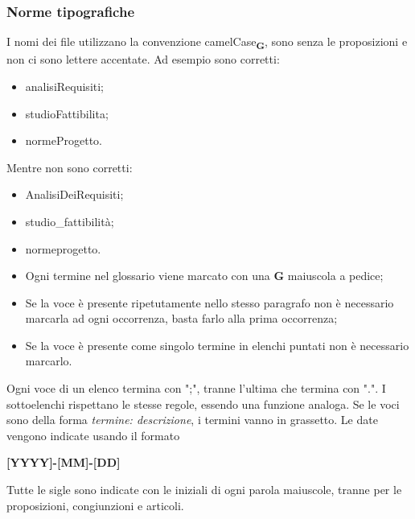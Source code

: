         \subsubsection{Norme tipografiche}
            I nomi dei file utilizzano la convenzione camelCase\textsubscript{\textbf{G}}, sono senza le proposizioni e non ci sono lettere accentate.
            Ad esempio sono corretti:
            \begin{itemize}
                \item analisiRequisiti;
                \item studioFattibilita;
                \item normeProgetto.
            \end{itemize}
            Mentre non sono corretti:
            \begin{itemize}
                \item AnalisiDeiRequisiti;
                \item studio\_fattibilità;
                \item normeprogetto.
            \end{itemize}
            
            \begin{itemize}
                \item Ogni termine nel glossario viene marcato con una \textbf{G} maiuscola a pedice;
                \item Se la voce è presente ripetutamente nello stesso paragrafo non è necessario marcarla ad ogni occorrenza, basta farlo alla prima occorrenza;
                \item Se la voce è presente come singolo termine in elenchi puntati non è necessario marcarlo. 
            \end{itemize}
            
            Ogni voce di un elenco termina con ";", tranne l'ultima che termina con ".". I sottoelenchi rispettano le stesse regole, essendo una funzione analoga. Se le voci sono della forma \textit{termine: descrizione}, i termini vanno in grassetto.
            Le date vengono indicate usando il formato
            \begin{center}
                \textbf{[YYYY]-[MM]-[DD]}
            \end{center}
            Tutte le sigle sono indicate con le iniziali di ogni parola maiuscole, tranne per le proposizioni, congiunzioni e articoli.
